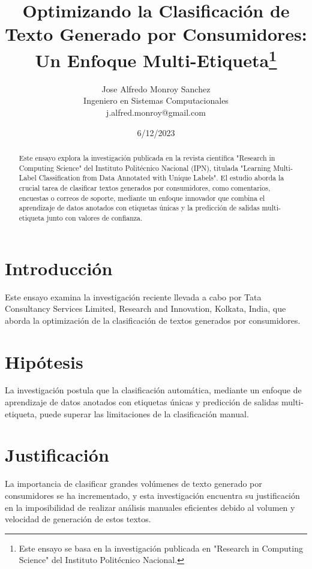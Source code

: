 \documentclass[12pt]{article}
\begin{document}
\title{Optimizando la Clasificación de Texto Generado por Consumidores: Un Enfoque Multi-Etiqueta\thanks{Este ensayo se basa en la investigación publicada en "Research in Computing Science" del Instituto Politécnico Nacional.}}

\author{Jose Alfredo Monroy Sanchez\\
Ingeniero en Sistemas Computacionales\\
j.alfred.monroy@gmail.com}

\date{6/12/2023}

\maketitle

\begin{abstract}
  Este ensayo explora la investigación publicada en la revista científica "Research in Computing Science" del Instituto Politécnico Nacional (IPN), titulada "Learning Multi-Label Classification from Data Annotated with Unique Labels". El estudio aborda la crucial tarea de clasificar textos generados por consumidores, como comentarios, encuestas o correos de soporte, mediante un enfoque innovador que combina el aprendizaje de datos anotados con etiquetas únicas y la predicción de salidas multi-etiqueta junto con valores de confianza.
\end{abstract}

\section{Introducción}
Este ensayo examina la investigación reciente llevada a cabo por Tata Consultancy Services Limited, Research and Innovation, Kolkata, India, que aborda la optimización de la clasificación de textos generados por consumidores.

\section{Hipótesis}
La investigación postula que la clasificación automática, mediante un enfoque de aprendizaje de datos anotados con etiquetas únicas y predicción de salidas multi-etiqueta, puede superar las limitaciones de la clasificación manual.

\section{Justificación}
La importancia de clasificar grandes volúmenes de texto generado por consumidores se ha incrementado, y esta investigación encuentra su justificación en la imposibilidad de realizar análisis manuales eficientes debido al volumen y velocidad de generación de estos textos.
\end{document}
